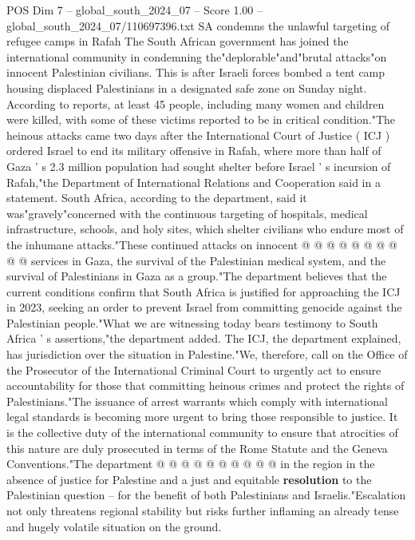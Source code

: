 \begin{textsample}{POS Dim 7 – global\_south\_2024\_07 – Score 1.00 – global\_south\_2024\_07/110697396.txt}  \label{ex:f7_pos_118}
SA condemns the unlawful targeting of refugee camps in Rafah The South African government has joined the international community in condemning the"deplorable"and"brutal attacks"on innocent Palestinian civilians.
This is after Israeli forces bombed a tent camp housing displaced Palestinians in a designated safe zone on Sunday night.
According to reports, at least 45 people, including many women and children were killed, with some of these victims reported to be in critical condition."The heinous attacks came two days after the International Court of Justice ( ICJ ) ordered Israel to end its military offensive in Rafah, where more than half of Gaza ' s 2.3 million population had sought shelter before Israel ' s incursion of Rafah,"the Department of International Relations and Cooperation said in a statement.
South Africa, according to the department, said it was"gravely"concerned with the continuous targeting of hospitals, medical infrastructure, schools, and holy sites, which shelter civilians who endure most of the inhumane attacks."These continued attacks on innocent @ @ @ @ @ @ @ @ @ @ services in Gaza, the survival of the Palestinian medical system, and the survival of Palestinians in Gaza as a group."The department believes that the current conditions confirm that South Africa is justified for approaching the ICJ in 2023, seeking an order to prevent Israel from committing genocide against the Palestinian people."What we are witnessing today bears testimony to South Africa ' s assertions,"the department added.
The ICJ, the department explained, has jurisdiction over the situation in Palestine."We, therefore, call on the Office of the Prosecutor of the International Criminal Court to urgently act to ensure accountability for those that committing heinous crimes and protect the rights of Palestinians."The issuance of arrest warrants which comply with international legal standards is becoming more urgent to bring those responsible to justice.
It is the collective duty of the international community to ensure that atrocities of this nature are duly prosecuted in terms of the Rome Statute and the Geneva Conventions."The department @ @ @ @ @ @ @ @ @ @ in the region in the absence of justice for Palestine and a just and equitable \textbf{resolution} to the Palestinian question -- for the benefit of both Palestinians and Israelis."Escalation not only threatens regional stability but risks further inflaming an already tense and hugely volatile situation on the ground.

\end{textsample}
